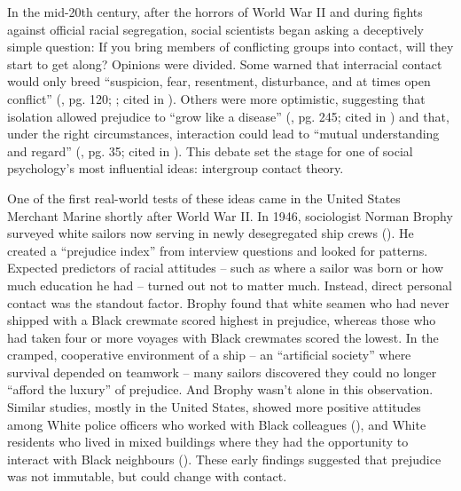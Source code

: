 \documentclass[
  letterpaper,
]{book}
\begin{document}
In the mid-20th century, after the horrors of World War II and during
fights against official racial segregation, social scientists began
asking a deceptively simple question: If you bring members of
conflicting groups into contact, will they start to get along? Opinions
were divided. Some warned that interracial contact would only breed
``suspicion, fear, resentment, disturbance, and at times open conflict''
(, pg. 120;
; cited in
). Others
were more optimistic, suggesting that isolation allowed prejudice to
``grow like a disease'' (, pg. 245; cited in ) and that, under the right circumstances, interaction
could lead to ``mutual understanding and regard''
(, pg. 35; cited in
). This
debate set the stage for one of social psychology's most influential
ideas: intergroup contact theory.

One of the first real-world tests of these ideas came in the United
States Merchant Marine shortly after World War II. In 1946, sociologist
Norman Brophy surveyed white sailors now serving in newly desegregated
ship crews (). He
created a ``prejudice index'' from interview questions and looked for
patterns. Expected predictors of racial attitudes -- such as where a
sailor was born or how much education he had -- turned out not to matter
much. Instead, direct personal contact was the standout factor. Brophy
found that white seamen who had never shipped with a Black crewmate
scored highest in prejudice, whereas those who had taken four or more
voyages with Black crewmates scored the lowest. In the cramped,
cooperative environment of a ship -- an ``artificial society'' where
survival depended on teamwork -- many sailors discovered they could no
longer ``afford the luxury'' of prejudice. And Brophy wasn't alone in
this observation. Similar studies, mostly in the United States, showed
more positive attitudes among White police officers who worked with
Black colleagues (),
and White residents who lived in mixed buildings where they had the
opportunity to interact with Black neighbours
().
These early findings suggested that prejudice was not immutable, but
could change with contact.
\end{document}

